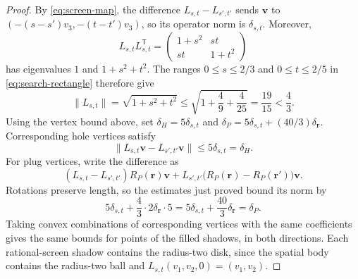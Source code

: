 \begin{proof}
  By \cref{eq:screen-map}, the difference $L_{s,t}-L_{s',t'}$ sends
  $\mathbf v$ to $(-(s-s')v_3,-(t-t')v_3)$, so its operator norm is
  $\delta_{s,t}$. Moreover,
  \[
    L_{s,t}L_{s,t}^{\mathsf T}
      =\begin{pmatrix}1+s^2&st\\st&1+t^2\end{pmatrix}
  \]
  has eigenvalues $1$ and $1+s^2+t^2$. The ranges $0\le s\le2/3$ and
  $0\le t\le2/5$ in \cref{eq:search-rectangle} therefore give
  \[
    \lVert L_{s,t}\rVert=\sqrt{1+s^2+t^2}
      \le\sqrt{1+\frac49+\frac4{25}}=\frac{19}{15}<\frac43.
  \]
  Using the vertex bound above, set
  $\delta_H=5\delta_{s,t}$ and
  $\delta_P=5\delta_{s,t}+(40/3)\delta_{\mathbf r}$.
  Corresponding hole vertices satisfy
  \[
    \lVert L_{s,t}\mathbf v-L_{s',t'}\mathbf v\rVert
      \le5\delta_{s,t}=\delta_H.
  \]
  For plug vertices, write the difference as
  \[
    (L_{s,t}-L_{s',t'})R_P(\mathbf r)\mathbf v
      +L_{s',t'}\bigl(R_P(\mathbf r)-R_P(\mathbf r')\bigr)\mathbf v.
  \]
  Rotations preserve length, so the estimates just proved bound its norm by
  \[
    5\delta_{s,t}+\frac43\cdot2\delta_{\mathbf r}\cdot5
      =5\delta_{s,t}+\frac{40}{3}\delta_{\mathbf r}=\delta_P.
  \]
  Taking convex combinations
  of corresponding vertices with the same coefficients gives the same bounds
  for points of the filled shadows, in both directions. Each rational-screen shadow
  contains the radius-two disk, since the spatial body contains the
  radius-two ball and $L_{s,t}(v_1,v_2,0)=(v_1,v_2)$.


\end{proof}
